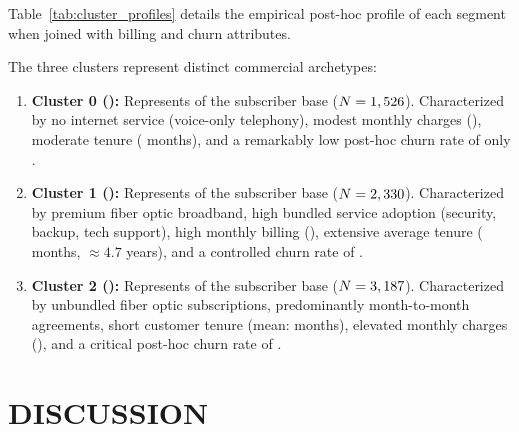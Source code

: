 Table~\ref{tab:cluster_profiles} details the empirical post-hoc profile of each segment when joined with billing and churn attributes.



The three clusters represent distinct commercial archetypes:
\begin{enumerate}
    \item \textbf{Cluster 0 (\clusterZeroName{}):} Represents \clusterZeroProp{} of the subscriber base ($N=1,526{}$). Characterized by no internet service (voice-only telephony), modest monthly charges (\clusterZeroMonthly{}), moderate tenure (\clusterZeroTenure{} months), and a remarkably low post-hoc churn rate of only \textbf{\clusterZeroChurn{}}.
    \item \textbf{Cluster 1 (\clusterOneName{}):} Represents \clusterOneProp{} of the subscriber base ($N=2,330{}$). Characterized by premium fiber optic broadband, high bundled service adoption (security, backup, tech support), high monthly billing (\clusterOneMonthly{}), extensive average tenure (\clusterOneTenure{} months, $\approx 4.7$ years), and a controlled churn rate of \textbf{\clusterOneChurn{}}.
    \item \textbf{Cluster 2 (\clusterTwoName{}):} Represents \clusterTwoProp{} of the subscriber base ($N=3,187{}$). Characterized by unbundled fiber optic subscriptions, predominantly month-to-month agreements, short customer tenure (mean: \clusterTwoTenure{} months), elevated monthly charges (\clusterTwoMonthly{}), and a critical post-hoc churn rate of \textbf{\clusterTwoChurn{}}.
\end{enumerate}

\section{DISCUSSION}

